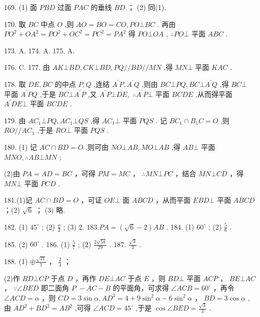 \documentclass[10pt]{article}
\newcommand*\circled[1]{\tikz[baseline=(char.base)]{\node[shape=circle,draw,inner sep=1.5pt] (char) {\small #1};}}
\begin{document}
169. (1) 面 \({PBD}\) 过面 \({PAC}\) 的垂线 \({BD}\) ； (2) 同(1).

170. 取 \({BC}\) 中点 \(O\) ,则 \({AO} = {BO} = {CO},{PO} \bot  {BC}\) . 再由 \(P{O}^{2} + O{A}^{2} = P{O}^{2} + O{C}^{2} = P{C}^{2} = P{A}^{2}\) 得 \({PO} \bot  {OA}\) , \(\therefore {PO} \bot\) 平面 \({ABC}\) .

173. A. 174. A. 175. A.

176. C. 177. 由 \({AK} \bot  {BD},{CK} \bot  {BD},{PQ}//{BD}//{MN}\) ,得 \({MN} \bot\) 平面 \({KAC}\) .

178. 取 \({DE},{BC}\) 的中点 \(P,Q\) ,连结 \({A}^{\prime }P,{A}^{\prime }Q\) ,则由 \({BC} \bot  {PQ},{BC} \bot  {A}^{\prime }Q\) ,得 \({BC} \bot\) 平面 \({A}^{\prime }{PQ}\) ,于是 \({BC} \bot  {A}^{\prime }P\) ,又 \({A}^{\prime }P \bot  {DE},\;\therefore {A}^{\prime }P \bot\) 平面 \({BCDE}\) ,从而得平面 \({A}^{\prime }{DE} \bot\) 平面 \({BCDE}\) .

179. 由 \(A{C}_{1} \bot  {PQ},A{C}_{1} \bot  {QS}\) ,得 \(A{C}_{1} \bot\) 平面 \({PQS}\) . 记 \(B{C}_{1} \cap  {B}_{1}C = O\) ,则 \({RO}//A{C}_{1}\) ,于是 \({RO} \bot\) 平面 \({PQS}\) .

180. (1) 记 \({AC} \cap  {BD} = O\) ,则可由 \({NO} \bot  {AB},{MO} \bot  {AB}\) ,得 \({AB} \bot\) 平面 \({MNO},\therefore {AB} \bot  {MN}\) ;

(2)由 \({PA} = {AD} = {BC}\) ，可得 \({PM} = {MC}\) ， \(\therefore {MN} \bot  {PC}\) ，结合 \({MN} \bot  {CD}\) ，得 \({MN}\bot\) 平面 \({PCD}\) .

181.(1)记 \({AC} \cap  {BD} = O\) ，可证 \({OE} \bot\) 面 \({ABCD}\) ，从而平面 \({EBD} \bot\) 平面 \({ABCD}\) ；(2) \(\sqrt{6}\) ； (3) 略.

182. (1) \({45}^{ \circ  }\) ; (2) \(\frac{a}{2}\) ; (3) 2. \({183.PA} = \left( {\sqrt{6} - 2}\right) {AB}\) . 184. (1) \({60}^{ \circ  }\) ; (2) \(\frac{5}{6}\) .

185. (2) \({60}^{ \circ  }\) . 186. (1) \(\frac{5}{7}\) ; (2) \(\frac{2\sqrt{58}}{29}\) . 187. \(\frac{\sqrt{3}}{3}\) .

188. (1) \(\oplus  \frac{\sqrt{21}}{7}\) ， \circled{2}  \(\frac{2}{3}\) ；

(2)作 \({BD} \bot  {CP}\) 于点 \(D\) ，再作 \({DE} \bot  {AC}\) 于点 \(E\) ，则 \({BD} \bot\) 平面 \({ACP}\) ， \({BE} \bot  {AC}\) ， \(\because \angle {BED}\) 即二面角 \(P \; - {AC} - B\) 的平面角，可求得 \(\angle {ACB} = {60}^{ \circ  }\) ，再令 \(\angle {ACD} = \alpha\) ，则 \({CD} = 3\sin \alpha ,A{D}^{2} = 4 + 9{\sin }^{2}\alpha  - 6{\sin }^{2}\alpha\) ， \({BD} = 3\cos \alpha\) ,由 \(A{D}^{2} + B{D}^{2} = A{B}^{2}\) ,可得 \(\angle {ACD} = {45}^{ \circ  }\) ,于是 \(\cos \angle {BED} = \frac{\sqrt{3}}{3}\) .
\end{document}
